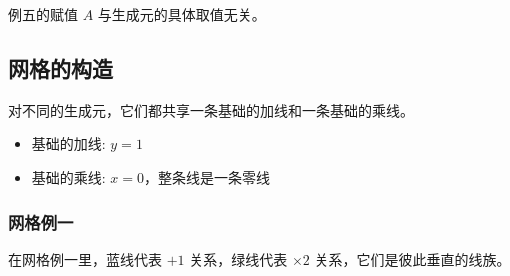 \documentclass[a4paper,12pt]{article}
\numberwithin{definition}{section}
\numberwithin{lemma}{section}
\numberwithin{proposition}{section}
\numberwithin{theorem}{section}
\numberwithin{grammar}{section}
\numberwithin{program}{section}
\numberwithin{convention}{section}
\numberwithin{corollary}{section}
\begin{document}
例五的赋值 $A$ 与生成元的具体取值无关。

\subsection{网格的构造}

对不同的生成元，它们都共享一条基础的加线和一条基础的乘线。
\begin{itemize}
    \item 基础的加线: $y = 1$
    \item 基础的乘线: $x = 0$，整条线是一条零线
\end{itemize}

\subsubsection{网格例一}

在网格例一里，蓝线代表 $+ 1$ 关系，绿线代表 $\times 2$ 关系，它们是彼此垂直的线族。
\end{document}
